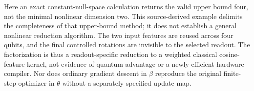 Here an exact constant-null-space calculation returns the valid
upper bound four, not the minimal nonlinear dimension two. This
source-derived example delimits the completeness of that upper-bound
method; it does not establish a general nonlinear reduction algorithm.
The two input features are reused across four qubits, and the final
controlled rotations are invisible to the selected readout. The
factorization is thus a readout-specific reduction to a weighted
classical cosine-feature kernel, not evidence of quantum advantage
or a newly efficient hardware compiler. Nor does ordinary gradient
descent in $\beta$ reproduce the original finite-step optimizer in
$\theta$ without a separately specified update map.
